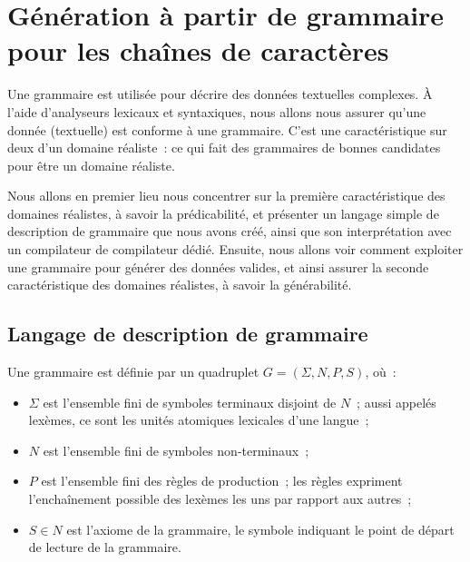 \section{Génération à partir de grammaire pour les chaînes de caractères}
\label{section:data:strings}

Une grammaire est utilisée pour décrire des données textuelles complexes. À
l'aide d'analyseurs lexicaux et syntaxiques, nous allons nous assurer qu'une
donnée (textuelle) est conforme à une grammaire. C'est une caractéristique sur
deux d'un domaine réaliste~: ce qui fait des grammaires de bonnes candidates
pour être un domaine réaliste.

Nous allons en premier lieu nous concentrer sur la première caractéristique des
domaines réalistes, à savoir la prédicabilité, et présenter un langage simple de
description de grammaire que nous avons créé, ainsi que son interprétation avec
un compilateur de compilateur dédié. Ensuite, nous allons voir comment exploiter
une grammaire pour générer des données valides, et ainsi assurer la seconde
caractéristique des domaines réalistes, à savoir la générabilité.

\subsection{Langage de description de grammaire}
\label{subsection:data:pp}

\begin{definition}[Grammaire]

Une grammaire est définie par un quadruplet $G = (\Sigma, N, P, S)$, où~:
%
\begin{itemize}

\item $\Sigma$ est l'ensemble fini de {\strong symboles terminaux} disjoint de
$N$~; aussi appelés {\strong lexèmes}, ce sont les unités atomiques lexicales
d'une langue~;

\item $N$ est l'ensemble fini de {\strong symboles non-terminaux}~;

\item $P$ est l'ensemble fini des {\strong règles de production}~; les règles
expriment l'enchaînement possible des lexèmes les uns par rapport aux autres~;

\item $S \in N$ est l'axiome de la grammaire, le symbole indiquant le point de
départ de lecture de la grammaire.

\end{itemize}

\end{definition}

